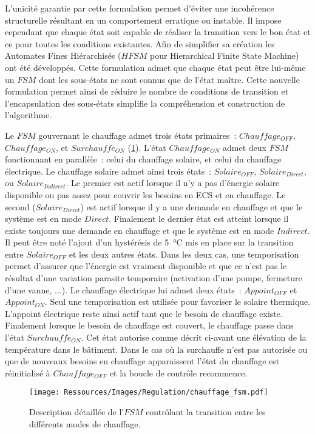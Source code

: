 L’unicité garantie par cette formulation permet d’éviter une incohérence structurelle
résultant en un comportement erratique ou instable. Il impose cependant que chaque état
soit capable de réaliser la transition vers le bon état et ce pour toutes les conditions
existantes. Afin de simplifier sa création les Automates Fines Hiérarchisés ($HFSM$
pour Hierarchical Finite State Machine) ont été développés. Cette formulation admet que
chaque état peut être lui-même un $FSM$ dont les sous-états ne sont connus que de
l’état maître. Cette nouvelle formulation permet ainsi de réduire le nombre de conditions
de transition et l’encapsulation des sous-états simplifie la compréhension et construction
de l’algorithme.


Le $FSM$ gouvernant le chauffage admet trois états primaires~: $Chauffage_{OFF}$,
$Chauffage_{ON}$, et $Surchauffe_{ON}$ (\ref{fig:automate_chauffage}). L’état
$Chauffage_{ON}$ admet deux $FSM$ fonctionnant en parallèle~: celui du chauffage
solaire, et celui du chauffage électrique. Le chauffage solaire admet ainsi trois états~:
$Solaire_{OFF}$, $Solaire_{Direct}$, ou $Solaire_{Indirect}$. Le premier est actif lorsque
il n’y a pas d’énergie solaire disponible ou pas assez pour couvrir les besoins en ECS et
en chauffage. Le second ($Solaire_{Direct}$) est actif lorsque il y a une demande en
chauffage et que le système est en mode $Direct$. Finalement le dernier état est atteint
lorsque il existe toujours une demande en chauffage et que le système est en mode
$Indirect$.
Il peut être noté l’ajout d’un hystérésis de \SI{5}{\celsius} mis en place sur la
transition entre $Solaire_{OFF}$ et les deux autres états. Dans les deux cas, une
temporisation permet d’assurer que l’énergie est vraiment disponible et que ce n’est pas
le résultat d’une variation parasite temporaire (activation d’une pompe, fermeture d’une
vanne, ...). Le chauffage électrique lui admet deux états~: $Appoint_{OFF}$ et
$Appoint_{ON}$. Seul une temporisation est utilisée pour favoriser le solaire thermique.
L’appoint électrique reste ainsi actif tant que le besoin de chauffage existe. Finalement
lorsque le besoin de chauffage est couvert, le chauffage passe dans l’état
$Surchauffe_{ON}$. Cet état autorise comme décrit ci-avant une élévation de la température
dans le bâtiment. Dans le cas où la surchauffe n’est pas autorisée ou que de nouveaux
besoins en chauffage apparaissent l’état du chauffage est réinitialisé à $Chauffage_{OFF}$
et la boucle de contrôle recommence.

\begin{figure}
    \begin{center}
        \texttt{[image: Ressources/Images/Regulation/chauffage\_fsm.pdf]}
    \end{center}
    \caption{Description détaillée de l’$FSM$ contrôlant la transition entre
             les différents modes de chauffage.
             \label{fig:automate_chauffage}}
\end{figure}


